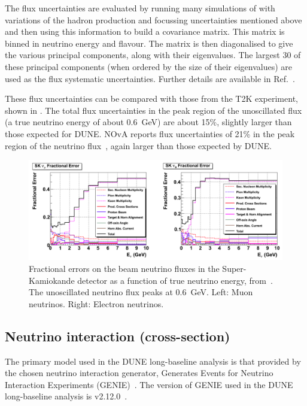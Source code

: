 The flux uncertainties are evaluated by running many simulations of with variations of the hadron production and focussing uncertainties mentioned above and then using this information to build a covariance matrix.
This matrix is binned in neutrino energy and flavour.
The matrix is then diagonalised to give the various principal components, along with their eigenvalues.
The largest 30 of these principal components (when ordered by the size of their eigenvalues) are used as the flux systematic uncertainties.
Further details are available in Ref.~\cite{duneFluxUncertainties}.

These flux uncertainties can be compared with those from the T2K experiment, shown in .
The total flux uncertainties in the peak region of the unoscillated flux (a true neutrino energy of about \SI{0.6}{\GeV}) are about 15\%, slightly larger than those expected for DUNE.
NOvA reports flux uncertainties of 21\% in the peak region of the neutrino flux~\cite{novaFluxUnc}, again larger than those expected by DUNE.

\begin{figure}[h]
  \centering
  \includegraphics[width=.9\linewidth]{files/figures/dune_lbl/t2kFluxUncertainties}
  \caption[Fractional errors on beam neutrino fluxes in Super-Kamiokande]{Fractional errors on the beam neutrino fluxes in the Super-Kamiokande detector as a function of true neutrino energy, from~\cite{t2kFluxUnc}. The unoscillated neutrino flux peaks at \SI{0.6}{\GeV}. Left: Muon neutrinos. Right: Electron neutrinos.}
  \label{fig:t2kFluxUnc}
\end{figure}


\subsection{Neutrino interaction (cross-section)}
\label{sec:dune_lbl:systs:xsec}

The primary model used in the DUNE long-baseline analysis is that provided by the chosen neutrino interaction generator, Generates Events for Neutrino Interaction Experiments (GENIE)~\cite{genie}.
The version of GENIE used in the DUNE long-baseline analysis is v2.12.0~\cite{tdrVol2}.

